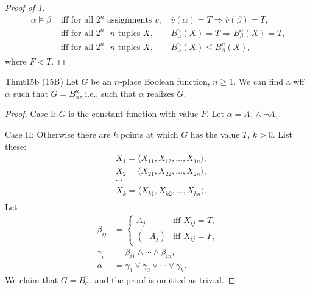 \begin{proof}[Proof of 1]
  \begin{align*}
    \alpha\vDash \beta & \text{ iff for all $2^n$ assignments $v$, } & \overline{v}(\alpha)=T\Rightarrow \overline{v}(\beta)=T, \\
                       & \text{ iff for all $2^n$ $n$-tuples $X$, }  & B^n_{\alpha}(X)=T\Rightarrow B^n_{\beta}(X)=T,           \\
                       & \text{ iff for all $2^n$ $n$-tuples $X$, }  & B^n_{\alpha}(X)\leq B^n_{\beta}(X),
  \end{align*}
  where $F<T$.
\end{proof}

\begin{reference}{Thm}{t15b}
  (15B) Let $G$ be an $n$-place Boolean function, $n\geq 1$. We can find a wff $\alpha$ such that $G=B_{\alpha}^n$, i.e., such that $\alpha$ realizes $G$.
\end{reference}

\begin{proof}
  Case I: $G$ is the constant function with value $F$. Let $\alpha=A_1\wedge\neg A_1$.

  Case II: Otherwise there are $k$ points at which $G$ has the value $T$, $k>0$. List these:
  \begin{align*}
     & X_1=\langle X_{11},X_{12},\dots,X_{1n}\rangle, \\
     & X_2=\langle X_{21},X_{22},\dots,X_{2n}\rangle, \\
     & \cdots                                         \\
     & X_k=\langle X_{k1},X_{k2},\dots,X_{kn}\rangle. \\
  \end{align*}
  Let
  \begin{align*}
    \beta_{ij} & =\begin{cases}
                    A_j        & \text{iff }X_{ij}=T, \\
                    (\neg A_j) & \text{iff }X_{ij}=F,
                  \end{cases}             \\
    \gamma_i   & = \beta_{i1}\wedge\cdots\wedge \beta_{in},     \\
    \alpha     & =\gamma_1\vee \gamma_2\vee\cdots\vee \gamma_k.
  \end{align*}
  We claim that $G=B_{\alpha}^n$, and the proof is omitted as trivial.
\end{proof}

